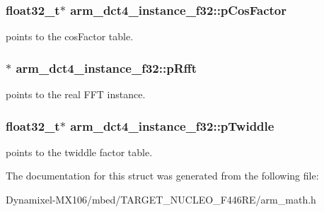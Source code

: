 \subsubsection[{\texorpdfstring{p\+Cos\+Factor}{pCosFactor}}]{\setlength{\rightskip}{0pt plus 5cm}float32\+\_\+t$\ast$ arm\+\_\+dct4\+\_\+instance\+\_\+f32\+::p\+Cos\+Factor}\hypertarget{structarm__dct4__instance__f32_a6da1187e070801e011ce5e0582efa861}{}\label{structarm__dct4__instance__f32_a6da1187e070801e011ce5e0582efa861}
points to the cos\+Factor table. 
\subsubsection[{\texorpdfstring{p\+Rfft}{pRfft}}]{$\ast$ arm\+\_\+dct4\+\_\+instance\+\_\+f32\+::p\+Rfft}\hypertarget{structarm__dct4__instance__f32_a978f37fc19add31af243ab5c63ae502f}{}\label{structarm__dct4__instance__f32_a978f37fc19add31af243ab5c63ae502f}
points to the real F\+FT instance. 
\subsubsection[{\texorpdfstring{p\+Twiddle}{pTwiddle}}]{\setlength{\rightskip}{0pt plus 5cm}float32\+\_\+t$\ast$ arm\+\_\+dct4\+\_\+instance\+\_\+f32\+::p\+Twiddle}\hypertarget{structarm__dct4__instance__f32_ad13544aafad268588c62e3eb35ae662c}{}\label{structarm__dct4__instance__f32_ad13544aafad268588c62e3eb35ae662c}
points to the twiddle factor table. 

The documentation for this struct was generated from the following file\+:\begin{DoxyCompactItemize}
\item 
Dynamixel-\/\+M\+X106/mbed/\+T\+A\+R\+G\+E\+T\+\_\+\+N\+U\+C\+L\+E\+O\+\_\+\+F446\+R\+E/arm\+\_\+math.\+h\end{DoxyCompactItemize}
